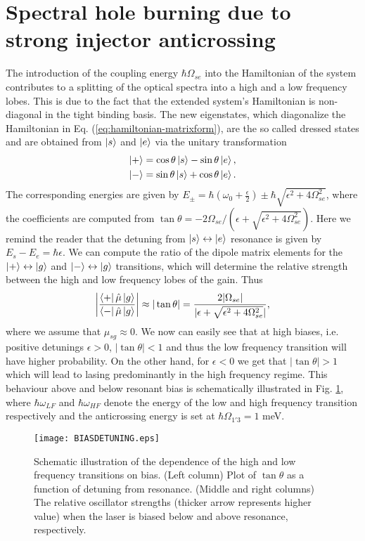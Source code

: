 \documentclass[]{spie}  %
\begin{document}
 \section{Spectral hole burning due to strong injector anticrossing}
 
 The introduction of the coupling energy $\hbar \Omega_{se}$ into the Hamiltonian of the system contributes to a splitting of the optical spectra into a high and a low frequency lobes. This is due to the fact that the extended system's Hamiltonian is non-diagonal in the tight binding basis. The new eigenstates, which diagonalize the Hamiltonian in Eq. (\ref{eq:hamiltonian-matrixform}), are the so called dressed states and are obtained from $\Ket{s}$ and $\Ket{e}$ via the unitary transformation
 \begin{align}
 \label{eq:dressedstates}
 \Ket{+} &= \cos\theta \Ket{s} - \sin\theta \Ket{e}, \nonumber \\
 \Ket{-} &= \sin\theta \Ket{s} + \cos\theta \Ket{e}.
 \end{align}
 The corresponding energies are given by $E_\pm =\hbar(\omega_0 +\frac{\epsilon}{2}) \pm \hbar\sqrt{\epsilon^2+4\Omega_{se}^2}$, where the coefficients are computed from  
 $
 \tan \theta = -2\Omega_{se}/(\epsilon+\sqrt{\epsilon^2+4\Omega_{se}^2}).
 $
 Here we remind the reader that the detuning from $\Ket {s}\leftrightarrow\Ket{e}$ resonance is given by $E_{s} - E_{e} = \hbar\epsilon$. We can compute the ratio of the dipole matrix elements for the $\Ket{+}\leftrightarrow\Ket{g}$ and $\Ket{-}\leftrightarrow\Ket{g}$ transitions, which will determine the relative strength between the high and low frequency lobes of the gain. Thus
 \begin{align}
 \label{eq:dresseddipoles}
 \left |\frac{\Bra{+}\hat{\mu}\Ket{g}}{\Bra{-}\hat{\mu}\Ket{g}}\right | \approx |\tan\theta| =  \frac{2|\Omega_{se}|}{|\epsilon+\sqrt{\epsilon^2+4\Omega_{se}^2}|},
 \end{align}
 where we assume that $\mu_{sg} \approx 0$.
 We now can easily see that at high biases, i.e. positive detunings $\epsilon >0$, $|\tan\theta|<1$ and thus the low frequency transition will have higher probability. On the other hand, for $\epsilon < 0 $ we get that $|\tan\theta| >1$ which will lead to lasing predominantly in the high frequency regime. This behaviour above and below resonant bias is schematically illustrated in Fig. \ref{fig:detuning}, where $\hbar\omega_{LF} $ and $\hbar\omega_{HF}$ denote the energy of the low and high frequency transition respectively and the anticrossing energy is set at $\hbar \Omega_{1'3} = 1$ meV.  
 \label{sec:biasdependence}
 \begin{figure}[h!]
 	\begin{center}
 		\texttt{[image: BIASDETUNING.eps]}
 		\caption{ Schematic illustration of the dependence of the high and low frequency transitions on bias. (Left column) Plot of $\tan\theta$ as a function of detuning from resonance. (Middle and right columns) The relative oscillator strengths (thicker arrow represents higher value) when the laser is biased below and above resonance, respectively. } \label{fig:detuning}
 	\end{center}	
 \end{figure}
\end{document}
